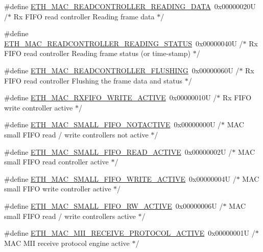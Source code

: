 \begin{DoxyCompactItemize}
\item 
\#define \hyperlink{group___h_a_l___e_t_h___aliased___defines_ga056b776e92442c623c3d848314e6c8f0}{E\+T\+H\+\_\+\+M\+A\+C\+\_\+\+R\+E\+A\+D\+C\+O\+N\+T\+R\+O\+L\+L\+E\+R\+\_\+\+R\+E\+A\+D\+I\+N\+G\+\_\+\+D\+A\+TA}~0x00000020\+U  /$\ast$ Rx F\+I\+F\+O read controller Reading frame data $\ast$/
\item 
\#define \hyperlink{group___h_a_l___e_t_h___aliased___defines_ga441228e7ee2416d37f22f5081d739e2c}{E\+T\+H\+\_\+\+M\+A\+C\+\_\+\+R\+E\+A\+D\+C\+O\+N\+T\+R\+O\+L\+L\+E\+R\+\_\+\+R\+E\+A\+D\+I\+N\+G\+\_\+\+S\+T\+A\+T\+US}~0x00000040\+U  /$\ast$ Rx F\+I\+F\+O read controller Reading frame status (or time-\/stamp) $\ast$/
\item 
\#define \hyperlink{group___h_a_l___e_t_h___aliased___defines_ga7a4fe56723328085b9b80adbfb528a5d}{E\+T\+H\+\_\+\+M\+A\+C\+\_\+\+R\+E\+A\+D\+C\+O\+N\+T\+R\+O\+L\+L\+E\+R\+\_\+\+F\+L\+U\+S\+H\+I\+NG}~0x00000060\+U  /$\ast$ Rx F\+I\+F\+O read controller Flushing the frame data and status $\ast$/
\item 
\#define \hyperlink{group___h_a_l___e_t_h___aliased___defines_gaed7a7d977c0411b7303270d6c35e19d2}{E\+T\+H\+\_\+\+M\+A\+C\+\_\+\+R\+X\+F\+I\+F\+O\+\_\+\+W\+R\+I\+T\+E\+\_\+\+A\+C\+T\+I\+VE}~0x00000010\+U  /$\ast$ Rx F\+I\+F\+O write controller active $\ast$/
\item 
\#define \hyperlink{group___h_a_l___e_t_h___aliased___defines_gac16927a1916a399766258aa819372c68}{E\+T\+H\+\_\+\+M\+A\+C\+\_\+\+S\+M\+A\+L\+L\+\_\+\+F\+I\+F\+O\+\_\+\+N\+O\+T\+A\+C\+T\+I\+VE}~0x00000000\+U  /$\ast$ M\+A\+C small F\+I\+F\+O read / write controllers not active $\ast$/
\item 
\#define \hyperlink{group___h_a_l___e_t_h___aliased___defines_gaaeb391df53728b1ee3d7dc0f26c89f05}{E\+T\+H\+\_\+\+M\+A\+C\+\_\+\+S\+M\+A\+L\+L\+\_\+\+F\+I\+F\+O\+\_\+\+R\+E\+A\+D\+\_\+\+A\+C\+T\+I\+VE}~0x00000002\+U  /$\ast$ M\+A\+C small F\+I\+F\+O read controller active $\ast$/
\item 
\#define \hyperlink{group___h_a_l___e_t_h___aliased___defines_ga54622c82079395c06def322572f42d90}{E\+T\+H\+\_\+\+M\+A\+C\+\_\+\+S\+M\+A\+L\+L\+\_\+\+F\+I\+F\+O\+\_\+\+W\+R\+I\+T\+E\+\_\+\+A\+C\+T\+I\+VE}~0x00000004\+U  /$\ast$ M\+A\+C small F\+I\+F\+O write controller active $\ast$/
\item 
\#define \hyperlink{group___h_a_l___e_t_h___aliased___defines_gaef20d59c181d5c3c828ea428e7c0d81e}{E\+T\+H\+\_\+\+M\+A\+C\+\_\+\+S\+M\+A\+L\+L\+\_\+\+F\+I\+F\+O\+\_\+\+R\+W\+\_\+\+A\+C\+T\+I\+VE}~0x00000006\+U  /$\ast$ M\+A\+C small F\+I\+F\+O read / write controllers active $\ast$/
\item 
\#define \hyperlink{group___h_a_l___e_t_h___aliased___defines_ga69bdbf3c1abe74dde1f5e1d2a85a501e}{E\+T\+H\+\_\+\+M\+A\+C\+\_\+\+M\+I\+I\+\_\+\+R\+E\+C\+E\+I\+V\+E\+\_\+\+P\+R\+O\+T\+O\+C\+O\+L\+\_\+\+A\+C\+T\+I\+VE}~0x00000001\+U  /$\ast$ M\+A\+C M\+I\+I receive protocol engine active $\ast$/
\end{DoxyCompactItemize}


